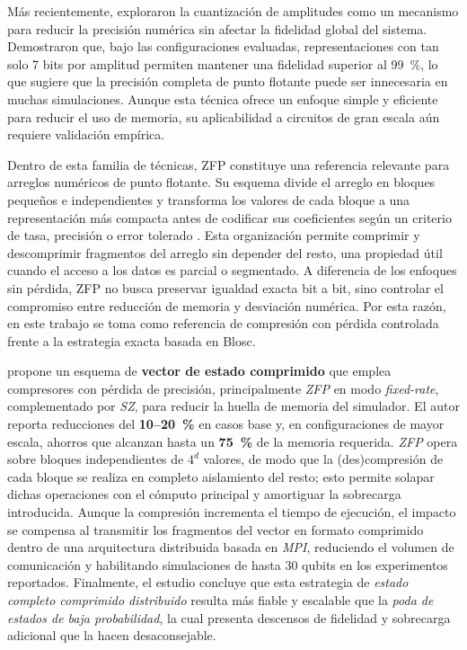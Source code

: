 Más recientemente, \textcite{Huffman2024} exploraron la cuantización de
amplitudes como un mecanismo para reducir la precisión numérica sin afectar la
fidelidad global del sistema. Demostraron que, bajo las configuraciones evaluadas,
representaciones con tan solo 7 bits por amplitud permiten mantener una fidelidad
superior al 99~\%, lo que sugiere que
la precisión completa de punto flotante puede ser innecesaria en muchas simulaciones.
Aunque esta técnica ofrece un enfoque simple y eficiente para reducir el uso
de memoria, su aplicabilidad a circuitos de gran escala aún requiere validación
empírica.

Dentro de esta familia de técnicas, ZFP constituye una referencia relevante para
arreglos numéricos de punto flotante. Su esquema divide el arreglo en bloques
pequeños e independientes y transforma los valores de cada bloque a una
representación más compacta antes de codificar sus coeficientes según un
criterio de tasa, precisión o error tolerado \parencite{Lindstrom2014ZFP}. Esta
organización permite comprimir y descomprimir fragmentos del arreglo sin
depender del resto, una propiedad útil cuando el acceso a los datos es parcial o
segmentado. A diferencia de los enfoques sin pérdida, ZFP no busca preservar
igualdad exacta bit a bit, sino controlar el compromiso entre reducción de
memoria y desviación numérica. Por esta razón, en este trabajo se toma como
referencia de compresión con pérdida controlada frente a la estrategia exacta
basada en Blosc.

\textcite{DiazToro2025} propone un esquema de \textbf{vector de estado
comprimido} que emplea compresores con pérdida de precisión, principalmente
\emph{ZFP} en modo \emph{fixed-rate}, complementado por \emph{SZ}, para reducir
la huella de memoria del simulador. El autor reporta reducciones del \textbf{10--20~\%}
en casos base y, en configuraciones de mayor escala, ahorros que alcanzan hasta
un \textbf{75~\%} de la memoria requerida. \emph{ZFP} opera sobre bloques independientes
de $4^{d}$ valores, de modo que la (des)compresión de cada bloque se realiza en
completo aislamiento del resto; esto permite solapar dichas operaciones con el
cómputo principal y amortiguar la sobrecarga introducida. Aunque la compresión
incrementa el tiempo de ejecución, el impacto se compensa al transmitir los
fragmentos del vector en formato comprimido dentro de una arquitectura
distribuida basada en \emph{MPI}, reduciendo el volumen de comunicación y
habilitando simulaciones de hasta $30$ qubits en los experimentos reportados. Finalmente,
el estudio concluye que esta estrategia de \textit{estado completo comprimido
distribuido} resulta más fiable y escalable que la \textit{poda de estados de
baja probabilidad}, la cual presenta descensos de fidelidad y sobrecarga adicional
que la hacen desaconsejable.
